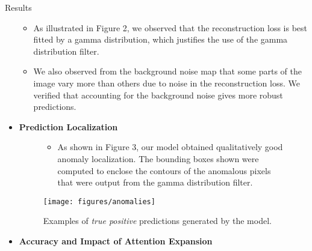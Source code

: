 \documentclass[final,hyperref={pdfpagelabels=false}]{beamer}
\begin{document}
\begin{frame}[t]
\begin{columns}[t]
\begin{column}{.465\textwidth}
\begin{block}{Results}
\begin{itemize}
\begin{itemize}
\item As illustrated in Figure 2, we observed that the reconstruction loss is best fitted by a gamma distribution, which justifies the use of the gamma distribution filter.

\item We also observed from the background noise map that some parts of the image vary more than others due to noise in the reconstruction loss. We verified that accounting for the background noise gives more robust predictions.\\[6mm]

\end{itemize}
\item\textbf{Prediction Localization}
\begin{figure}

\begin{itemize}
\item As shown in Figure 3, our model obtained qualitatively good anomaly localization. The bounding boxes shown were computed to enclose the contours of the anomalous pixels that were output from the gamma distribution filter.\\[6mm]
\end{itemize}
\texttt{[image: figures/anomalies]}
\caption{Examples of \textit{true positive} predictions generated by the model.\qquad\quad~}
\end{figure}

\item \textbf{Accuracy and Impact of Attention Expansion}\\[6mm]


\end{itemize}
\end{block}
\end{column}
\end{columns}
\end{frame}
\end{document}
